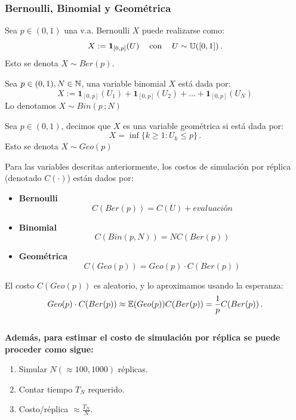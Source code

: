 \subsubsection{Bernoulli, Binomial y Geométrica}
\begin{definition}
Sea $p\in(0,1)$ una v.a. Bernoulli $X$ puede realizarse como:
$$ X:=\mathbf{1}_{[0,p]}(U) \hspace{.25cm}\, \mbox{ con } \hspace{.25cm}\, U\sim\mathbb{U}([0,1]) \, .$$
Esto se denota $ X\sim Ber(p)$.
\end{definition}
\begin{definition}
Sea $p\in(0,1),N\in\mathbb{N}$, una variable binomial $X$ está dada por:
$$ X:=\mathbf{1}_{[0,p]}(U_1)+\mathbf{1}_{[0,p]}(U_2)+\dots+\mathbf{1}_{[0,p]}(U_N)$$
Lo denotamos $X\sim Bin(p\,;N)$
\end{definition}
\begin{definition}
Sea $p\in(0,1)$, decimos que $X$ es una variable geométrica si está dada por:
$$ X=\inf\{k\geq1:U_k\leq p\} \, .$$
Esto se denota $X\sim Geo(p)$
\end{definition}
\begin{remark}
Para las variables descritas anteriormente, los costos de simulación por réplica (denotado $C(\cdot)$) están dados por:
\begin{itemize}
    \item \textbf{Bernoulli}
    $$ C(Ber(p)) = C(U) + evaluación $$
    \item \textbf{Binomial}
    $$ C(Bin(p,N)) = N C(Ber(p))$$
    \item \textbf{Geométrica}
    $$ C(Geo(p)) = Geo(p)\cdot C(Ber(p))$$
\end{itemize}
El costo $C(Geo(p))$ es aleatorio, y lo aproximamos usando la esperanza:
$$ Geo(p)\cdot C(Ber(p))\approx \mathbb{E}(Geo(p))C(Ber(p))=\displaystyle\frac{1}{p}C(Ber(p)) \, .$$
\\ \textbf{Además, para estimar el costo de simulación por réplica se puede proceder como sigue:}
\begin{enumerate}
    \item Simular $N(\approx100,1000)$ réplicas.
    \item Contar tiempo $T_N$ requerido.
    \item Costo/réplica $\approx \displaystyle\frac{T_N}{N}$.
\end{enumerate}
\end{remark}

